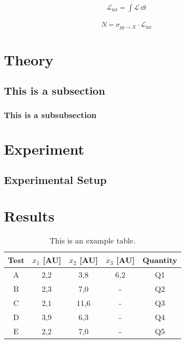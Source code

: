 \documentclass[twocolumn,
			   showpacs,%
               nofootinbib,
               aps,%
               prd,
               notitlepage,
               showkeys,
               10pt]{revtex4-1}
\begin{document}
\blindtext

\begin{align}
\mathcal{L}_{\text{int}} = \int \mathcal{L} \ \dd t	
\end{align}

\blindtext

\begin{align}
N = \sigma_{pp\rightarrow X} \cdot \mathcal{L}_{\text{int}}
\end{align}


\section{Theory}

\blindtext

\subsection{This is a subsection}

\subsubsection{This is a subsubsection}

\blindtext





\section{Experiment}




\subsection{Experimental Setup}


\blindtext




\section{Results}
\blindtext



\begin{table}[!htbp]
\centering
\setlength{\tabcolsep}{2mm}
\renewcommand{\arraystretch}{1.5}
\begin{tabular}{|c||c|c|c|c|}
\hline
Test & $x_1$ [AU] & $x_2$ [AU] & $x_3$ [AU] & Quantity \\ \hline \hline
A & 2,2 & 3,8 & 6,2 & Q1 \\
\hline
B & 2,3 & 7,0 & - & Q2 \\
\hline
C & 2,1 & 11,6 & - & Q3 \\
\hline
D & 3,9 & 6,3 & - & Q4\\
\hline
E & 2,2 & 7,0 & - & Q5 \\
\hline
\end{tabular}
\caption{\label{tab:test}This is an example table.}
\end{table}
\end{document}
